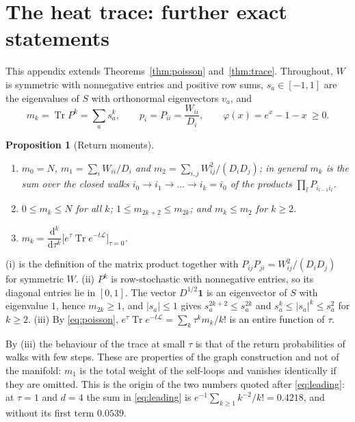\documentclass[11pt,a4paper]{article}
\makeatletter
\theoremstyle{stmt}
\newtheorem{proposition}[theorem]{Proposition}
\theoremstyle{defn}
\theoremstyle{rmk}
\renewenvironment{proof}[1][\proofname]{\par\pushQED{\qed}\normalfont\topsep6\p@\@plus6\p@\relax
  \trivlist\item[\hskip\labelsep{\sffamily\itshape\small #1.}]\ignorespaces}{\popQED\endtrivlist\@endpefalse}
\numberwithin{equation}{section}
\DeclareMathOperator{\Tr}{Tr}
\newcommand{\Lc}{\mathcal{L}}
\newcommand{\dd}{\mathrm{d}}
\makeatother
\begin{document}
{\small\sloppy
\section{The heat trace: further exact statements}\label{app:heat}

This appendix extends Theorems~\ref{thm:poisson} and~\ref{thm:trace}. Throughout, $W$ is symmetric with nonnegative entries and positive row sums, $s_a\in[-1,1]$ are the eigenvalues of $S$ with orthonormal eigenvectors $v_a$, and
\[
m_k=\Tr P^k=\sum_as_a^k,\qquad p_i=P_{ii}=\frac{W_{ii}}{D_i},\qquad\varphi(x)=e^x-1-x\ \ge0 .
\]

\begin{proposition}[Return moments]\label{prop:moments}
\begin{enumerate}[label=\textup{(\roman*)}]
\item $m_0=N$, $m_1=\sum_iW_{ii}/D_i$ and $m_2=\sum_{i,j}W_{ij}^2/(D_iD_j)$; in general $m_k$ is the sum over the closed walks $i_0\to i_1\to\dots\to i_k=i_0$ of the products $\prod_lP_{i_{l-1}i_l}$.
\item $0\le m_k\le N$ for all $k$; $1\le m_{2k+2}\le m_{2k}$; and $m_k\le m_2$ for $k\ge2$.
\item $m_k=\dfrac{\dd^k}{\dd\tau^k}\Big[e^{\tau}\Tr e^{-t\Lc}\Big]_{\tau=0}$.
\end{enumerate}
\end{proposition}

\begin{proof}
(i) is the definition of the matrix product together with $P_{ij}P_{ji}=W_{ij}^2/(D_iD_j)$ for symmetric $W$. (ii) $P^k$ is row-stochastic with nonnegative entries, so its diagonal entries lie in $[0,1]$. The vector $D^{1/2}\mathbf 1$ is an eigenvector of $S$ with eigenvalue $1$, hence $m_{2k}\ge1$, and $|s_a|\le1$ gives $s_a^{2k+2}\le s_a^{2k}$ and $s_a^k\le|s_a|^k\le s_a^2$ for $k\ge2$. (iii) By \eqref{eq:poisson}, $e^\tau\Tr e^{-t\Lc}=\sum_k\tau^km_k/k!$ is an entire function of $\tau$.
\end{proof}

By (iii) the behaviour of the trace at small $\tau$ is that of the return probabilities of walks with few steps. These are properties of the graph construction and not of the manifold: $m_1$ is the total weight of the self-loops and vanishes identically if they are omitted. This is the origin of the two numbers quoted after \eqref{eq:leading}: at $\tau=1$ and $d=4$ the sum in \eqref{eq:leading} is $e^{-1}\sum_{k\ge1}k^{-2}/k!=0.4218$, and without its first term $0.0539$.

}
\end{document}
